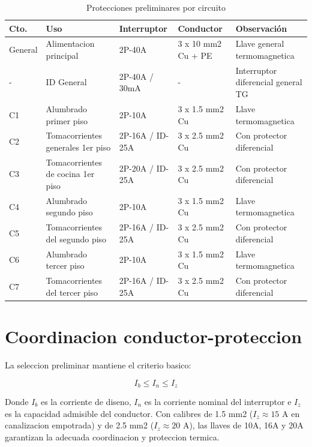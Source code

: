 \begin{table}[H]
\centering
\small
\setlength{\tabcolsep}{3pt}
\caption{Protecciones preliminares por circuito}
\label{tab:protecciones-preliminares}
\begin{tabularx}{\textwidth}{l Y Y Y Y}
\toprule
\textbf{Cto.} & \textbf{Uso} & \textbf{Interruptor} & \textbf{Conductor} & \textbf{Observación} \\
\midrule
General & Alimentacion principal & 2P-40A & 3 x 10 mm2 Cu + PE & Llave general termomagnetica \\
- & ID General & 2P-40A / 30mA & - & Interruptor diferencial general TG \\
C1 & Alumbrado primer piso & 2P-10A & 3 x 1.5 mm2 Cu & Llave termomagnetica \\
C2 & Tomacorrientes generales 1er piso & 2P-16A / ID-25A & 3 x 2.5 mm2 Cu & Con protector diferencial \\
C3 & Tomacorrientes de cocina 1er piso & 2P-20A / ID-25A & 3 x 2.5 mm2 Cu & Con protector diferencial \\
C4 & Alumbrado segundo piso & 2P-10A & 3 x 1.5 mm2 Cu & Llave termomagnetica \\
C5 & Tomacorrientes del segundo piso & 2P-16A / ID-25A & 3 x 2.5 mm2 Cu & Con protector diferencial \\
C6 & Alumbrado tercer piso & 2P-10A & 3 x 1.5 mm2 Cu & Llave termomagnetica \\
C7 & Tomacorrientes del tercer piso & 2P-16A / ID-25A & 3 x 2.5 mm2 Cu & Con protector diferencial \\
\bottomrule
\end{tabularx}
\end{table}

\section{Coordinacion conductor-proteccion}

La seleccion preliminar mantiene el criterio basico:

\begin{equation}
I_b \leq I_n \leq I_z
\end{equation}

Donde $I_b$ es la corriente de diseno, $I_n$ es la corriente nominal del interruptor e $I_z$ es la capacidad admisible del conductor. Con calibres de 1.5 mm2 ($I_z \approx 15\text{ A}$ en canalizacion empotrada) y de 2.5 mm2 ($I_z \approx 20\text{ A}$), las llaves de 10A, 16A y 20A garantizan la adecuada coordinacion y proteccion termica.

